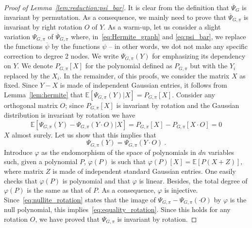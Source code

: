 \documentclass{article}
\begin{document}
\begin{proof}[Proof of Lemma~\ref{lem:reduction:psi_bar}]

It is clear from the definition that $\overline{\Psi}_{G}$ is invariant by permutation. As a consequence, we mainly need to prove that $\overline{\Psi}_{G,\pi}$ is invariant by right rotation $O$ of $Y$.  As a warm-up, let us consider a slight variation  $\Psi_{G,\pi}$ of $\overline{\Psi}_{G,\pi}$ where, in~\eqref{eq:Hermite_graph} and \eqref{eq:psi_bar}, we replace the functions $\overline{\psi}$ by the functions $\psi$ -- in other words, we dot not make any specific correction to degree 2 nodes. We write $\Psi_{G,\pi}(Y)$ for emphasizing its dependency on $Y$. We denote $P_{G,\pi}[X]$ for the polynomial defined as $P_{G,\pi}$ but with the  $Y_i$ replaced by the $X_i$. In the remainder, of this proofs, we consider the matrix $X$ as fixed. 
Since $Y-X$ is made of independent Gaussian entries, it follows from Lemma~\ref{lem:hermite} that $\mathbb{E}[\Psi_{G,\pi}(Y)|X]= P_{G,\pi}[X]$. Consider any orthogonal matrix $O$; since $P_{G,\pi}[X]$ is invariant by rotation and the Gaussian distribution is invariant by rotation we have 
\begin{equation}\label{eq:nullite_rotation}
\mathbb{E}[\Psi_{G,\pi}(Y)- \Psi_{G,\pi}(Y\cdot O)|X]= P_{G,\pi}[X] - P_{G,\pi}[X\cdot O]=0
\end{equation}
$X$ almost surely.
Let us show that this implies that 
\begin{equation}\label{eq:equality_rotation}
\Psi_{G,\pi}(Y)= \Psi_{G,\pi}(Y\cdot O) \ . 
\end{equation}
Introduce $\varphi$ as the endomorphism of the space of polynomials in $dn$ variables such, given a polynomial $P$, $\varphi(P)$ is such that $\varphi(P)[X]= \mathbb{E}[P(X+Z)]$, where matrix $Z$ is made of independent standard Gaussian entries. One easily checks that $\varphi(P)$ is polynomial and that $\varphi$ is linear. Besides, the total degree of $\varphi(P)$ is the same as that of $P$. As a consequence, $\varphi$ is injective. Since~\eqref{eq:nullite_rotation} states that the image of  $\Psi_{G,\pi} - \Psi_{G,\pi}(\cdot O)$ by $\varphi$ is the null polynomial, this implies~\eqref{eq:equality_rotation}. Since this holds for any rotation $O$, we have proved that $\Psi_{G,\pi}$ is invariant by rotation. 


\end{proof}
\end{document}
